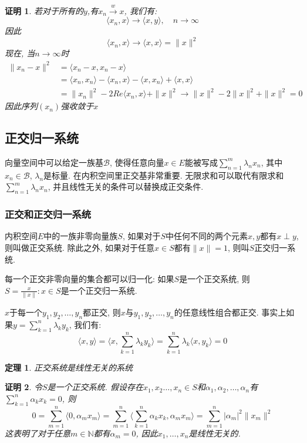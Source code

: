 \documentclass[a4paper,11pt]{article}
\theoremstyle{mystyle}
\newtheorem{theorem}{\hspace{2em}定理}[section]
\newtheorem{Proof}{\hspace{2em}证明}[section]
\begin{document}
\begin{Proof}
  若对于所有的$y$,有$x_n\stackrel{w}{\to}x$, 我们有:
  \begin{equation*}
    \langle x_n,x\rangle\to\langle x,y\rangle,\quad n\to\infty
  \end{equation*}
  因此
  \begin{equation*}
    \langle x_n,x\rangle\to\langle x,x\rangle=\|x\|^2
  \end{equation*}
  现在, 当$n\to\infty$时
  \begin{equation*}
    \begin{split}
       \|x_n-x\|^2 & =\langle x_n-x,x_n-x\rangle \\
         & =\langle x_n,x_n\rangle-\langle x_n,x\rangle-\langle x,x_n\rangle+\langle x,x\rangle \\
         & =\|x_n\|^2-2Re\langle x_n,x\rangle+\|x\|^2\to\|x\|^2-2\|x\|^2+\|x\|^2=0
    \end{split}
  \end{equation*}
  因此序列$(x_n)$强收敛于$x$
\end{Proof}
\subsection{正交归一系统}
向量空间中可以给定一族基$\mathcal{B}$, 使得任意向量$x\in E$能被写成$\sum_{n=1}^{m}\lambda_nx_n$, 其中$x_n\in \mathcal{B}$, $\lambda_n$是标量. 在内积空间里正交基非常重要. 无限求和可以取代有限求和$\sum_{n=1}^{m}\lambda_nx_n$, 并且线性无关的条件可以替换成正交条件.
\subsubsection*{正交和正交归一系统}
\begin{definition}
  内积空间$E$中的一族非零向量族$S$, 如果对于$S$中任何不同的两个元素$x,y$都有$x\perp y$, 则叫做正交系统. 除此之外, 如果对于任意$x\in S$都有$\|x\|=1$, 则叫$S$正交归一系统.
\end{definition}
每一个正交非零向量的集合都可以归一化: 如果$S$是一个正交系统, 则$S={\frac{x}{\|x\|}:x\in S}$是一个正交归一系统.

$x$于每一个$y_1,y_2,\dots,y_n$都正交, 则$x$与$y_1,y_2,\dots,y_n$的任意线性组合都正交. 事实上如果$y=\sum_{k=1}^{n}\lambda_ky_k$, 我们有:
\begin{equation*}
  \langle x,y\rangle=\langle x,\sum_{k=1}^{n}\lambda_ky_k\rangle=\sum_{k=1}^{n}\lambda_k\langle x,y_k\rangle=0
\end{equation*}
\begin{theorem}
  正交系统是线性无关的系统
\end{theorem}
\begin{Proof}
  令$S$是一个正交系统. 假设存在$x_1,x_2\dots,x_n\in S$和$\alpha_1,\alpha_2,\dots,\alpha_n$有$\sum_{k=1}^{n}\alpha_kx_k=0$, 则
  \begin{equation*}
    0=\sum_{m=1}^{n}\langle0,\alpha_mx_m\rangle=\sum_{m=1}^{n}\langle\sum_{k=1}^{n}\alpha_kx_k,\alpha_mx_m\rangle=\sum_{m=1}^{n}|\alpha_m|^2\|x_m\|^2
  \end{equation*}
  这表明了对于任意$m\in \mathbb{N}$都有$\alpha_m=0$, 因此$x_1,\dots,x_n$是线性无关的.
\end{Proof}
\end{document}
